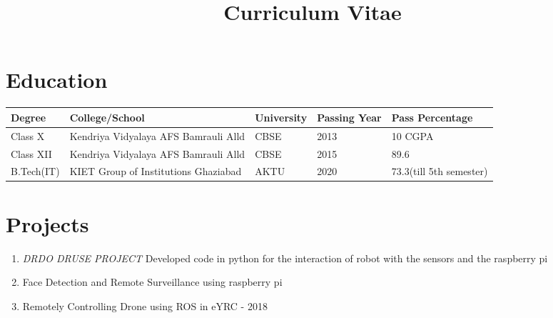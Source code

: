 \documentclass[11pt,a4paper,sans]{moderncv} %
\title{Curriculum Vitae}
\begin{document}

\makecvtitle %


\section{Education}










\setlength{\arrayrulewidth}{1mm}
\setlength{\tabcolsep}{18pt}
\renewcommand{\arraystretch}{1.5}
\hspace*{-2.5cm}
\begin{tabular}{ |p{3cm}|p{3cm}|p{3cm}|p{3cm}|p{2cm}|  }
		
		
		\hline
		Degree & College/School & University & Passing Year & Pass Percentage \\
		\hline
		Class X & Kendriya Vidyalaya AFS Bamrauli Alld & CBSE & 2013 & 10 CGPA \\
		Class XII & Kendriya Vidyalaya AFS Bamrauli Alld   & CBSE & 2015 & 89.6\\
		B.Tech(IT) & KIET Group of Institutions Ghaziabad & AKTU & 2020 & 73.3(till 5th semester)\\
		
		\hline
\end{tabular}

\section{Projects}
\begin{enumerate}
	
	\item \textit{DRDO DRUSE PROJECT} {Developed code in python for the interaction of robot with the sensors and the raspberry pi}
	\newline{}
	\item Face Detection and Remote Surveillance using raspberry pi
	\newline{}
	\item Remotely Controlling Drone using ROS in eYRC - 2018
	\newline{}
\end{enumerate}
\end{document}
